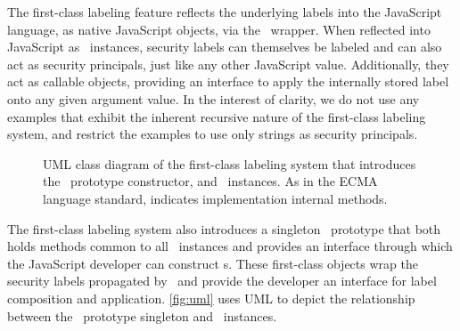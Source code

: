 The first-class labeling feature reflects the underlying labels into the JavaScript language, as native JavaScript objects, via the \FlowLabelObject\ wrapper.
When reflected into JavaScript as \FlowLabelObject\ instances, security labels can themselves be labeled and can also act as security principals, just like any other JavaScript value.
Additionally, they act as callable objects, providing an interface to apply the internally stored label onto any given argument value.
In the interest of clarity, we do not use any examples that exhibit the inherent recursive nature of the first-class labeling system, and restrict the examples to use only strings as security principals.

\begin{figure}[ht]
  \centering
{}
  \caption{UML class diagram of the first-class labeling system that introduces the \FlowLabel\ prototype constructor, and \FlowLabelObject\ instances.
  As in the ECMA~\cite{ecma} language standard, \bracketdbl{\textbullet} indicates implementation internal methods.}
  \label{fig:uml}
\end{figure}

The first-class labeling system also introduces a singleton \FlowLabel\ prototype that both holds methods common to all \FlowLabelObject\ instances and provides an interface through which the JavaScript developer can construct \FlowLabelObject s.
These first-class objects wrap the security labels propagated by \JitFlow\ and provide the developer an interface for label composition and application.
\autoref{fig:uml} uses UML to depict the relationship between the \FlowLabel\ prototype singleton and \FlowLabelObject\ instances.

